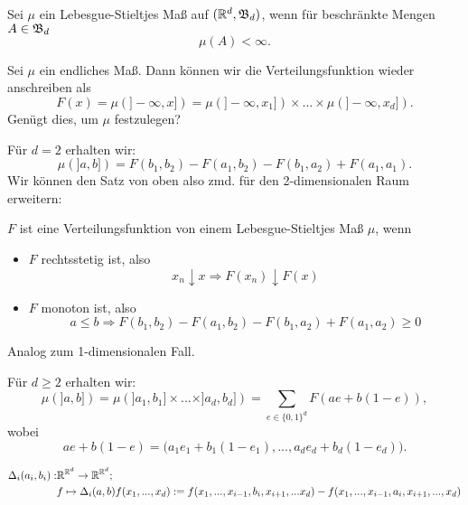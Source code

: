 			\begin{defi}
				Sei $\mu$ ein Lebesgue-Stieltjes Maß auf $(\mathbb{R}^d, \mathfrak{B}_d)$, wenn für beschränkte Mengen $A\in\mathfrak{B}_d$
				\[ \mu(A)<\infty. \]
			\end{defi}
			
			\begin{bem}
				Sei $\mu$ ein endliches Maß. Dann können wir die Verteilungsfunktion wieder anschreiben als
				\[ F(x)=\mu(]-\infty,x])=\mu(]-\infty,x_1])\times...\times\mu(]-\infty,x_d]). \]
				Genügt dies, um $\mu$ festzulegen?
			\end{bem}
			
			\begin{bsp}
				Für $d=2$ erhalten wir:
				\[ \mu(]a,b])=F(b_1,b_2)-F(a_1,b_2)-F(b_1,a_2)+F(a_1,a_1). \]
				Wir können den Satz von oben also zmd. für den 2-dimensionalen Raum erweitern:
			\end{bsp}
			
			\begin{satz}
				$F$ ist eine Verteilungsfunktion von einem Lebesgue-Stieltjes Maß $\mu$, wenn 
				\begin{itemize}
					\item $F$ rechtsstetig ist, also
					\[ x_n\downarrow x\Rightarrow F(x_n)\downarrow F(x) \]
					\item $F$ monoton ist, also
					\[ a\le b\Rightarrow F(b_1,b_2)-F(a_1,b_2)-F(b_1,a_2)+F(a_1,a_2)\ge 0 \]
				\end{itemize}
			\end{satz}
			
			\begin{bew}
				Analog zum 1-dimensionalen Fall.
			\end{bew}
			
			\begin{bsp}
				Für $d\ge 2$ erhalten wir:
				\[ \mu(]a,b])=\mu(]a_1,b_1]\times...\times]a_d,b_d])=\sum_{e\in\{0,1\}^d} F(ae+b(1-e)), \]
				wobei 
				\[ ae+b(1-e)=\big(a_1e_1+b_1(1-e_1),...,a_de_d+b_d(1-e_d)\big). \]
			\end{bsp}
			
			\begin{defi}[Differenzoperatoren]
				\begin{align*} \Delta_i(a_i,b_i): &\mathbb{R}^{\mathbb{R}^d}\to\mathbb{R}^{\mathbb{R}^d};\\&f\mapsto \Delta_i (a,b)f(x_1,...,x_d):=f(x_1,...,x_{i-1},b_i,x_{i+1},...x_d)-f(x_1,...,x_{i-1},a_i,x_{i+1},...,x_d)
				\end{align*}
			\end{defi}
			
